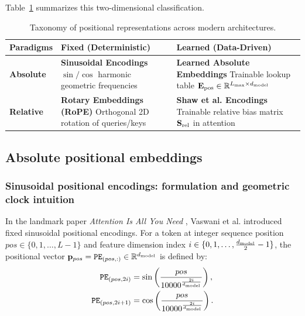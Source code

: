 \documentclass[../../../main.tex]{subfiles}
\begin{document}
Table~\ref{tab:pe_taxonomy_matrix} summarizes this two-dimensional classification.

\begin{table}[htbp]
\centering
\small
\caption{Taxonomy of positional representations across modern architectures.}
\label{tab:pe_taxonomy_matrix}
\begin{tabularx}{\textwidth}{lXX}
\toprule
\textbf{Paradigms} & \textbf{Fixed (Deterministic)} & \textbf{Learned (Data-Driven)} \\
\midrule
\textbf{Absolute} & \textbf{Sinusoidal Encodings} \cite{vaswani2017} \newline $\sin/\cos$ harmonic geometric frequencies & \textbf{Learned Absolute Embeddings} \cite{radford2019, devlin2019} \newline Trainable lookup table $\mathbf{E}_{\text{pos}} \in \mathbb{R}^{L_{\max} \times d_{\text{model}}}$ \\
\midrule
\textbf{Relative} & \textbf{Rotary Embeddings (RoPE)} \cite{su2024roformer} \newline Orthogonal 2D rotation of queries/keys & \textbf{Shaw et al. Encodings} \cite{shaw2018} \newline Trainable relative bias matrix $\mathbf{S}_{\text{rel}}$ in attention \\
\bottomrule
\end{tabularx}
\end{table}

\subsection{Absolute positional embeddings}
\label{subsec:absolute_pe}

\subsubsection{Sinusoidal positional encodings: formulation and geometric clock intuition}
In the landmark paper \emph{Attention Is All You Need} \cite{vaswani2017}, Vaswani et al. introduced fixed sinusoidal positional encodings. For a token at integer sequence position $pos \in \{0, 1, \dots, L-1\}$ and feature dimension index $i \in \{0, 1, \dots, \frac{d_{\text{model}}}{2}-1\}$, the positional vector $\mathbf{p}_{pos} = \text{\texttt{PE}}_{(pos, :)} \in \mathbb{R}^{d_{\text{model}}}$ is defined by:
\begin{align}
\label{eq:sinusoidal_pe_even_ch5}
\text{\texttt{PE}}_{(pos, 2i)} &= \sin\left(\frac{pos}{10000^{\frac{2i}{d_{\text{model}}}}}\right), \\
\label{eq:sinusoidal_pe_odd_ch5}
\text{\texttt{PE}}_{(pos, 2i+1)} &= \cos\left(\frac{pos}{10000^{\frac{2i}{d_{\text{model}}}}}\right).
\end{align}
\end{document}
